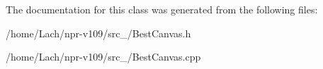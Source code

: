 The documentation for this class was generated from the following files\+:\begin{DoxyCompactItemize}
\item 
/home/\+Lach/npr-\/v109/src\+\_/Best\+Canvas.\+h\item 
/home/\+Lach/npr-\/v109/src\+\_/Best\+Canvas.\+cpp\end{DoxyCompactItemize}
